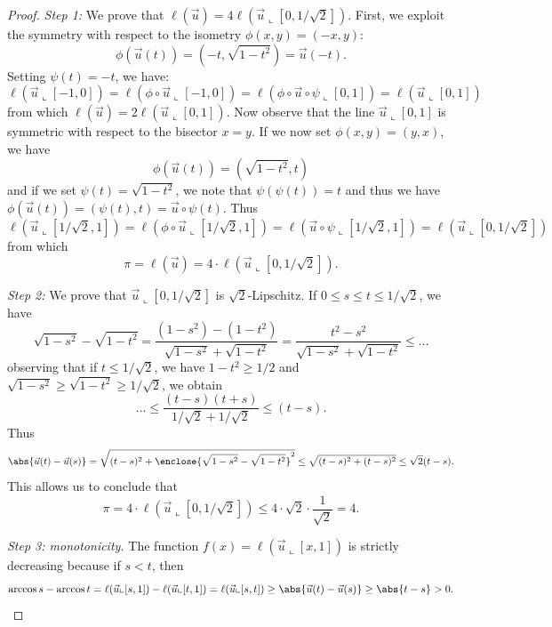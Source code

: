 \begin{proof}

\emph{Step 1:}
We prove that $\ell(\vec u ) = 4 \ell(\vec u\llcorner[0,1/\sqrt 2])$. First, we
exploit the symmetry with respect to the isometry $\phi(x,y) = (-x,y)$:
\[
  \phi(\vec u(t)) = (-t,\sqrt{1-t^2})
  = \vec u(-t).
\]
Setting $\psi(t)=-t$, we have:
\[
\ell(\vec u \llcorner[-1,0]) 
= \ell(\phi\circ \vec u \llcorner [-1,0])
= \ell(\phi\circ \vec u \circ \psi \llcorner[0,1])
= \ell(\vec u\llcorner[0,1])
\]
from which $\ell(\vec u) = 2 \ell(\vec u \llcorner[0,1])$.
Now observe that the line $\vec u\llcorner[0,1]$ is symmetric with respect to
the bisector $x=y$. If we now set $\phi(x,y) = (y,x)$, we have
\[
\phi(\vec u(t)) = (\sqrt{1-t^2},t)   
\]
and if we set $\psi(t) = \sqrt{1-t^2}$, we note that $\psi(\psi(t)) = t$ and
thus we have $\phi(\vec u(t)) = (\psi(t),t) =\vec u\circ \psi(t)$. Thus
\[
\ell(\vec u\llcorner[1/\sqrt 2,1])
= \ell(\phi\circ \vec u \llcorner[1/\sqrt 2, 1])
= \ell(\vec u\circ \psi \llcorner[1/\sqrt 2, 1])  
= \ell(\vec u\llcorner [0,1/\sqrt 2])
\]
from which 
\[
\pi = \ell(\vec u) = 4 \cdot \ell(\vec u \llcorner[0,1/\sqrt 2]).  
\]

\emph{Step 2:} 
We prove that $\vec u\llcorner[0,1/\sqrt 2]$ is $\sqrt 2$-Lipschitz. If $0 \le
s\le t\le 1/\sqrt 2$, we have
\[
  \sqrt{1-s^2} - \sqrt{1-t^2}
  = \frac{(1-s^2) - (1-t^2)}{\sqrt{1-s^2} + \sqrt{1-t^2}}
  = \frac{t^2-s^2}{\sqrt{1-s^2} + \sqrt{1-t^2}}
  \le \dots 
\]
observing that if $t\le 1/\sqrt 2$, we have $1-t^2 \ge 1/2$ and $\sqrt{1-s^2}
\ge \sqrt{1-t^2} \ge 1/\sqrt 2$, we obtain
\[
  \dots 
  \le \frac{(t-s)(t+s)}{1/\sqrt 2 + 1/\sqrt 2}
  \le (t-s).
\]
Thus 
\[
  \abs{\vec u(t)-\vec u(s)}
  =\sqrt{(t-s)^2 + \enclose{\sqrt{1-s^2}-\sqrt{1-t^2}}^2}
  \le \sqrt{(t-s)^2 + (t-s)^2} \le \sqrt 2 (t-s).  
\]
This allows us to conclude that 
\[
\pi = 4 \cdot \ell(\vec u\llcorner [0,1/\sqrt 2])
\le 4 \cdot \sqrt 2 \cdot \frac{1}{\sqrt 2} = 4.  
\]

\emph{Step 3: monotonicity.}
The function $f(x)=\ell(\vec u\llcorner[x,1])$ is strictly decreasing because if
$s<t$, then
\[
 \arccos s - \arccos t 
 = \ell(\vec u\llcorner [s,1]) - \ell(\vec u\llcorner [t,1])  
 = \ell(\vec u\llcorner [s,t]) 
 \ge \abs{\vec u(t)-\vec u(s)} 
 \ge \abs{t-s} > 0.
\]


\end{proof}
